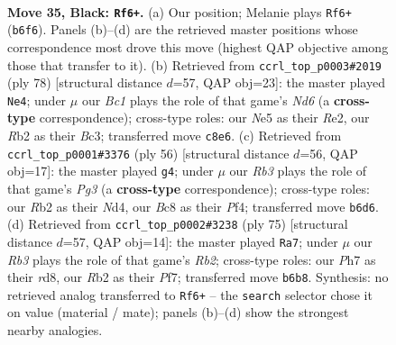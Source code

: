 \documentclass[11pt]{article}
\begin{document}
\clearpage

\begin{figure}[p]\centering
\begin{subfigure}{0.46\textwidth}\centering
\resizebox{\linewidth}{!}{%
\newchessgame
\chessboard[
  setfen={2b4k/R4p1p/1r4p1/3Pn3/1p2P3/6P1/1r5P/5KNR b - - 1 35},
  showmover=false,
  pgfstyle=straightmove, color=movearrow, markmove={b6-f6}
]}
\caption{}
\end{subfigure}\hfill
\begin{subfigure}{0.46\textwidth}\centering
\resizebox{\linewidth}{!}{%
\newchessgame
\chessboard[
  setfen={rn3k2/6p1/3N1p2/P1p4p/b7/2B2P1P/4R1P1/6K1 w - - 4 40},
  showmover=false,
  pgfstyle=straightmove, color=movearrow, markmove={d6-e4}
]}
\caption{}
\end{subfigure}
\\[4pt]
\begin{subfigure}{0.46\textwidth}\centering
\resizebox{\linewidth}{!}{%
\newchessgame
\chessboard[
  setfen={8/r1p2kpp/3npp2/8/3N1P2/1PR3P1/4P2P/6K1 w - - 5 29},
  showmover=false,
  pgfstyle=straightmove, color=movearrow, markmove={g3-g4}
]}
\caption{}
\end{subfigure}\hfill
\begin{subfigure}{0.46\textwidth}\centering
\resizebox{\linewidth}{!}{%
\newchessgame
\chessboard[
  setfen={3R4/1r3pk1/6p1/3P3p/2r1p2P/P5P1/5P2/4R1K1 b - - 3 38},
  showmover=false,
  pgfstyle=straightmove, color=movearrow, markmove={b7-a7}
]}
\caption{}
\end{subfigure}
\caption{\textbf{Move 35, Black: \texttt{Rf6+}.} (a) Our position; Melanie plays \texttt{Rf6+} (\texttt{b6f6}). Panels (b)--(d) are the retrieved master positions whose correspondence most drove this move (highest QAP objective among those that transfer to it). (b) Retrieved from \texttt{ccrl\_top\_p0003\#2019} (ply 78) [structural distance $d$=57, QAP obj=23]: the master played \texttt{Ne4}; under $\mu$ our \emph{Bc1} plays the role of that game's \emph{Nd6} (a \textbf{cross-type} correspondence); cross-type roles: our \emph{N}e5 as their \emph{R}e2, our \emph{R}b2 as their \emph{B}c3; transferred move \texttt{c8e6}. (c) Retrieved from \texttt{ccrl\_top\_p0001\#3376} (ply 56) [structural distance $d$=56, QAP obj=17]: the master played \texttt{g4}; under $\mu$ our \emph{Rb3} plays the role of that game's \emph{Pg3} (a \textbf{cross-type} correspondence); cross-type roles: our \emph{R}b2 as their \emph{N}d4, our \emph{B}c8 as their \emph{P}f4; transferred move \texttt{b6d6}. (d) Retrieved from \texttt{ccrl\_top\_p0002\#3238} (ply 75) [structural distance $d$=57, QAP obj=14]: the master played \texttt{Ra7}; under $\mu$ our \emph{Rb3} plays the role of that game's \emph{Rb2}; cross-type roles: our \emph{P}h7 as their \emph{r}d8, our \emph{R}b2 as their \emph{P}f7; transferred move \texttt{b6b8}. Synthesis: no retrieved analog transferred to \texttt{Rf6+} -- the \texttt{search} selector chose it on value (material / mate); panels (b)--(d) show the strongest nearby analogies.}
\label{fig:thought-m69}
\end{figure}
\end{document}
